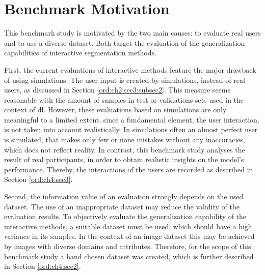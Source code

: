
\section{Benchmark Motivation}\label{ord:ch4:sec1}

This benchmark study is motivated by the two main causes: to evaluate real users and to use a diverse dataset.
Both target the evaluation of the generalization capabilities of interactive segmentation methods.

First, the current evaluations of interactive methods feature the major drawback of using simulations.
The user input is created by simulations, instead of real users, as discussed in Section \ref{ord:ch2:sec3:subsec2}.
This measure seems reasonable with the amount of samples in test or validations sets used in the context of \gls{dl}.
However, these evaluations based on simulations are only meaningful to a limited extent, since a fundamental element, the user interaction, is not taken into account realistically.
In simulations often an almost perfect user is simulated, that makes only few or none mistakes without any inaccuracies, which does not reflect reality.
In contrast, this benchmark study analyses the result of real participants, in order to obtain realistic insights on the model's performance.
Thereby, the interactions of the users are recorded as described in Section \ref{ord:ch4:sec3}.

Second, the information value of an evaluation strongly depends on the used dataset.
The use of an inappropriate dataset may reduce the validity of the evaluation results.
To objectively evaluate the generalization capability of the interactive methods, a suitable dataset must be used, which should have a high variance in its samples.
In the context of an image dataset this may be achieved by images with diverse domains and attributes.
Therefore, for the scope of this benchmark study a hand chosen dataset was created, which is further described in Section \ref{ord:ch4:sec2}.

